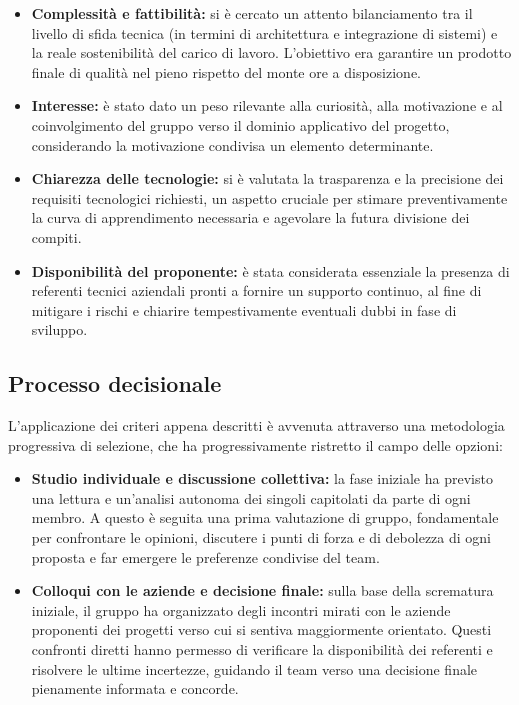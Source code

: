 \documentclass[a4paper,12pt]{article}
\begin{document}
\begin{itemize}
    \item \textbf{Complessità e fattibilità:} si è cercato un attento bilanciamento tra il livello di sfida tecnica (in termini di architettura e integrazione di sistemi) e la reale sostenibilità del carico di lavoro. L'obiettivo era garantire un prodotto finale di qualità nel pieno rispetto del monte ore a disposizione.
    \item \textbf{Interesse:} è stato dato un peso rilevante alla curiosità, alla motivazione e al coinvolgimento del gruppo verso il dominio applicativo del progetto, considerando la motivazione condivisa un elemento determinante.
    \item \textbf{Chiarezza delle tecnologie:} si è valutata la trasparenza e la precisione dei requisiti tecnologici richiesti, un aspetto cruciale per stimare preventivamente la curva di apprendimento necessaria e agevolare la futura divisione dei compiti.
    \item \textbf{Disponibilità del proponente:} è stata considerata essenziale la presenza di referenti tecnici aziendali pronti a fornire un supporto continuo, al fine di mitigare i rischi e chiarire tempestivamente eventuali dubbi in fase di sviluppo.
\end{itemize}

\subsection{Processo decisionale}

L'applicazione dei criteri appena descritti è avvenuta attraverso una metodologia progressiva di selezione, che ha progressivamente ristretto il campo delle opzioni:

\begin{itemize}
    \item \textbf{Studio individuale e discussione collettiva:} la fase iniziale ha previsto una lettura e un'analisi autonoma dei singoli capitolati da parte di ogni membro. A questo è seguita una prima valutazione di gruppo, fondamentale per confrontare le opinioni, discutere i punti di forza e di debolezza di ogni proposta e far emergere le preferenze condivise del team.
    \item \textbf{Colloqui con le aziende e decisione finale:} sulla base della scrematura iniziale, il gruppo ha organizzato degli incontri mirati con le aziende proponenti dei progetti verso cui si sentiva maggiormente orientato. Questi confronti diretti hanno permesso di verificare la disponibilità dei referenti e risolvere le ultime incertezze, guidando il team verso una decisione finale pienamente informata e concorde.
\end{itemize}
\end{document}
